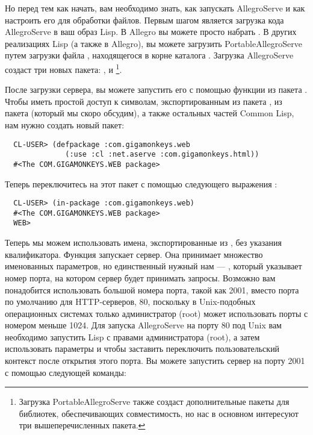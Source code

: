 Но перед тем как начать, вам необходимо знать, как запускать AllegroServe и как настроить
его для обработки файлов. Первым шагом является загрузка кода AllegroServe в ваш образ
Lisp. В Allegro вы можете просто набрать . В других реализациях
Lisp (а также в Allegro), вы можете загрузить PortableAllegroServe путем загрузки файла
, находящегося в корне каталога . Загрузка
AllegroServe создаст три новых пакета: ,  и
\footnote{Загрузка PortableAllegroServe также создаст
  дополнительные пакеты для библиотек, обеспечивающих совместимость, но нас в основном
  интересуют три вышеперечисленных пакета.}.

После загрузки сервера, вы можете запустить его с помощью функции  из пакета
. Чтобы иметь простой доступ к символам, экспортированным из пакета
, из пакета  (который мы скоро обсудим), а
также остальных частей Common Lisp, нам нужно создать новый пакет:

\begin{lstlisting}
  CL-USER> (defpackage :com.gigamonkeys.web
              (:use :cl :net.aserve :com.gigamonkeys.html))
  #<The COM.GIGAMONKEYS.WEB package>
\end{lstlisting}

Теперь переключитесь на этот пакет с помощью следующего выражения :

\begin{lstlisting}
  CL-USER> (in-package :com.gigamonkeys.web)
  #<The COM.GIGAMONKEYS.WEB package>
  WEB>
\end{lstlisting} 

Теперь мы можем использовать имена, экспортированные из , без указания
квалификатора. Функция  запускает сервер. Она принимает множество именованных
параметров, но единственный нужный нам --- , который указывает номер порта, на
котором сервер будет принимать запросы.  Возможно вам понадобится использовать большой
номера порта, такой как 2001, вместо порта по умолчанию для HTTP-серверов, 80, поскольку в
Unix-подобных операционных системах только администратор (root) может использовать порты с
номером меньше 1024. Для запуска AllegroServe на порту 80 под Unix вам необходимо
запустить Lisp с правами администратора (root), а затем использовать параметры
 и  чтобы заставить  переключить пользовательский
контекст после открытия этого порта. Вы можете запустить сервер на порту 2001 с помощью
следующей команды:

